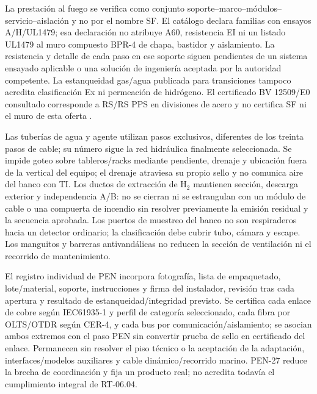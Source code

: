 La prestación al fuego se verifica como conjunto soporte--marco--módulos--servicio--aislación y no por el nombre SF. El catálogo declara familias con ensayos A/H/UL1479; esa declaración no atribuye A60, resistencia EI ni un listado UL1479 al muro compuesto BPR-4 de chapa, bastidor y aislamiento. La resistencia y detalle de cada paso en ese soporte siguen pendientes de un sistema ensayado aplicable o una solución de ingeniería aceptada por la autoridad competente. La estanqueidad gas/agua publicada para transiciones tampoco acredita clasificación Ex ni permeación de hidrógeno. El certificado BV 12509/E0 consultado corresponde a RS/RS PPS en divisiones de acero y no certifica SF ni el muro de esta oferta \parencites{l27-roxtec-marine,l27-roxtec-bv}.

Las tuberías de agua y agente utilizan pasos exclusivos, diferentes de los treinta pasos de cable; su número sigue la red hidráulica finalmente seleccionada. Se impide goteo sobre tableros/racks mediante pendiente, drenaje y ubicación fuera de la vertical del equipo; el drenaje atraviesa su propio sello y no comunica aire del banco con TI. Los ductos de extracción de H$_2$ mantienen sección, descarga exterior y independencia A/B: no se cierran ni se estrangulan con un módulo de cable o una compuerta de incendio sin resolver previamente la emisión residual y la secuencia aprobada. Los puertos de muestreo del banco no son respiraderos hacia un detector ordinario; la clasificación debe cubrir tubo, cámara y escape. Los manguitos y barreras antivandálicas no reducen la sección de ventilación ni el recorrido de mantenimiento.

El registro individual de PEN incorpora fotografía, lista de empaquetado, lote/material, soporte, instrucciones y firma del instalador, revisión tras cada apertura y resultado de estanqueidad/integridad previsto. Se certifica cada enlace de cobre según IEC61935-1 y perfil de categoría seleccionado, cada fibra por OLTS/OTDR según CER-4, y cada bus por comunicación/aislamiento; se asocian ambos extremos con el paso PEN sin convertir prueba de sello en certificado del enlace. Permanecen sin resolver el piso técnico o la aceptación de la adaptación, interfaces/modelos auxiliares y cable dinámico/recorrido marino. PEN-27 reduce la brecha de coordinación y fija un producto real; no acredita todavía el cumplimiento integral de RT-06.04.

